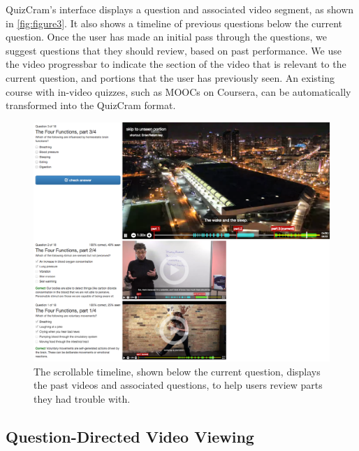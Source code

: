 \documentclass{chi-ext}
\begin{document}
QuizCram's interface displays a question and associated video segment, as shown in \autoref{fig:figure3}. It also shows a timeline of previous questions below the current question. Once the user has made an initial pass through the questions, we suggest questions that they should review, based on past performance. We use the video progressbar to indicate the section of the video that is relevant to the current question, and portions that the user has previously seen. An existing course with in-video quizzes, such as MOOCs on Coursera, can be automatically transformed into the QuizCram format. 

\begin{figure}
\centering
\includegraphics[width=1.0\columnwidth]{quizcram-and-timeline2}
\caption{The scrollable timeline, shown below the current question, displays the past videos and associated questions, to help users review parts they had trouble with.}
\label{fig:figure3}
\end{figure}


\subsection{Question-Directed Video Viewing}
\end{document}
